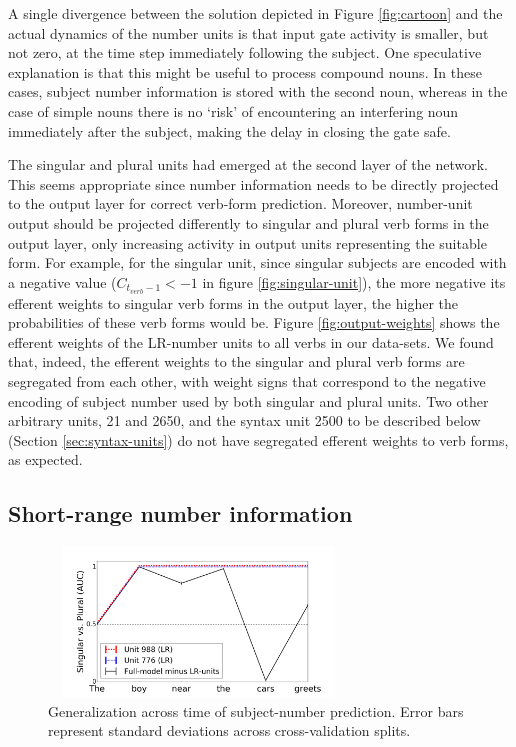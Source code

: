 A single divergence between the solution depicted in Figure \ref{fig:cartoon} and the actual dynamics of the number units is that input gate activity is smaller, but not zero, at the time step immediately following the subject. One speculative explanation is that this might be useful to process compound nouns. In these cases, subject number information is stored with the second noun, whereas in the case of simple nouns there is no `risk' of encountering an interfering noun immediately after the subject, making the delay in closing the gate safe.


The singular and plural units had emerged at the second layer of the network. This seems appropriate since number information needs to be directly projected to the output layer for correct verb-form prediction. Moreover, number-unit output should be projected differently to singular and plural verb forms in the output layer, only increasing activity in output units representing the suitable form. For example, for the singular unit, since singular subjects are encoded with a negative value ($C_{t_{verb}-1}<-1$ in figure \ref{fig:singular-unit}), the more negative its efferent weights to singular verb forms in the output layer, the higher the probabilities of these verb forms would be. Figure \ref{fig:output-weights} shows the efferent weights of the LR-number units to all verbs in our data-sets. We found that, indeed, the efferent weights to the singular and plural verb forms are segregated from each other, with weight signs that correspond to the negative encoding of subject number used by both singular and plural units. Two other arbitrary units, \unit{2}{1} and \unit{2}{650}, and the syntax unit \unit{2}{500} to be described below (Section \ref{sec:syntax-units}) do not have segregated efferent weights to verb forms, as expected. 

\subsection{Short-range number information}
\begin{figure}
    \centering
    \includegraphics[height=4cm, width=8cm]{Figures/GAT1d_cell_.png}
    \caption{Generalization across time of subject-number prediction. Error bars represent standard deviations across cross-validation splits.}
    \label{fig:GAT}
\end{figure}

